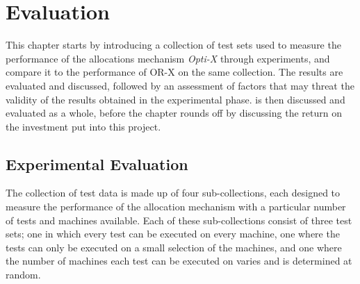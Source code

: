 \section{Evaluation}\label{chapter.discussion}
\thispagestyle{plain}

This chapter starts by introducing a collection of test sets used to measure the performance of the allocations mechanism \emph{Opti-X} through experiments, and compare it to the performance of OR-X on the same collection. The results are evaluated and discussed, followed by an assessment of factors that may threat the validity of the results obtained in the experimental phase. \toolname \space is then discussed and evaluated as a whole, before the chapter rounds off by discussing the return on the investment put into this project.


\subsection{Experimental Evaluation}

The collection of test data is made up of four sub-collections, each designed to measure the performance of the allocation mechanism with a particular number of tests and machines available. Each of these sub-collections consist of three test sets; one in which every test can be executed on every machine, one where the tests can only be executed on a small selection of the machines, and one where the number of machines each test can be executed on varies and is determined at random.

